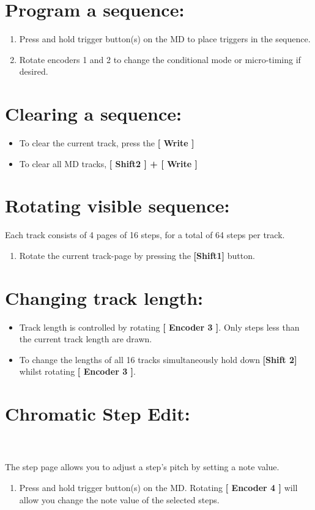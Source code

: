 \section{Program a sequence:}
\begin{enumerate}
\item Press and hold trigger button(s) on the MD to place triggers in the sequence.
\item Rotate encoders 1 and 2 to change the conditional mode or micro-timing if desired.
\end{enumerate}
\section{Clearing a sequence:}
\begin{itemize}
\item To clear the current track, press the\textbf{ [ Write ]}
\item To clear all MD tracks,  \textbf{[ Shift2 ] + [ Write ]}
\end{itemize}
\section{Rotating visible sequence:}
Each track consists of 4 pages of 16 steps, for a total of 64 steps per track.
\begin{enumerate}
\item Rotate the current track-page by pressing the \textbf{[Shift1] }button.
\end{enumerate}
\section{Changing track length:}
\begin{itemize}
\item Track length is controlled by rotating \textbf{[ Encoder 3 ]}. Only steps less than the current track length are drawn.
\item To change the lengths of all 16 tracks simultaneously hold down \textbf{[Shift 2]} whilst rotating \textbf{[ Encoder 3 ]}.
\end{itemize}
\section{Chromatic Step Edit:}
\\
\\
The step page allows you to adjust a step's pitch by setting a note value. 
\begin{enumerate}
\item Press and hold trigger button(s) on the MD. Rotating \textbf{[ Encoder 4 ]} will allow you change the note value of the selected steps.
\end{enumerate}
